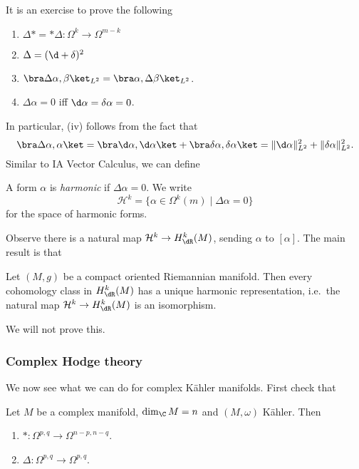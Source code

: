 \documentclass[a4paper]{article}
\begin{document}
It is an exercise to prove the following
\begin{prop}\leavevmode
  \begin{enumerate}
    \item $\Delta * = *\Delta: \Omega^k \to \Omega^{m - k}$
    \item $\Delta = (\d + \delta)^2$
    \item $\bra \Delta \alpha, \beta\ket_{L^2} = \bra \alpha, \Delta \beta\ket_{L^2}$.
    \item $\Delta \alpha = 0$ iff $\d \alpha = \delta \alpha = 0$.\fakeqed
  \end{enumerate}
\end{prop}
In particular, (iv) follows from the fact that
\[
  \bra \Delta \alpha, \alpha\ket = \bra \d \alpha, \d \alpha\ket + \bra \delta \alpha, \delta \alpha\ket = \|\d \alpha\|_{L^2}^2 + \|\delta \alpha\|_{L^2}^2.
\]
Similar to IA Vector Calculus, we can define
\begin{defi}
  A form $\alpha$ is \emph{harmonic} if $\Delta \alpha = 0$. We write
  \[
    \mathcal{H}^k = \{\alpha \in \Omega^k(m) \mid \Delta \alpha = 0\}
  \]
  for the space of harmonic forms.
\end{defi}
Observe there is a natural map $\mathcal{H}^k \to H^k_{\dR}(M)$, sending $\alpha$ to $[\alpha]$. The main result is that
\begin{thm}
  Let $(M, g)$ be a compact oriented Riemannian manifold. Then every cohomology class in $H_{\dR}^k(M)$ has a unique harmonic representation, i.e.\ the natural map $\mathcal{H} ^k \to H_{\dR}^k(M)$ is an isomorphism.\qedhere
\end{thm}
We will not prove this.

\subsubsection*{Complex Hodge theory}
We now see what we can do for complex K\"ahler manifolds. First check that
\begin{prop}
  Let $M$ be a complex manifold, $\dim_\C M = n$ and $(M, \omega)$ K\"ahler. Then
  \begin{enumerate}
    \item $*: \Omega^{p, q} \to \Omega^{n - p, n - q}$.
    \item $\Delta: \Omega^{p, q} \to \Omega^{p, q}$.\fakeqed
  \end{enumerate}
\end{prop}
\end{document}

